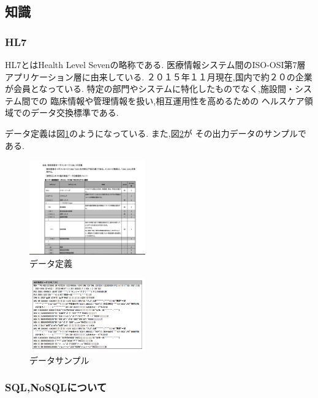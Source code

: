 \subsection{知識}

  \subsubsection{HL7 \cite{bibi5} \cite{bibi6} }
  HL7とはHealth Level Sevenの略称である.
  医療情報システム間のISO-OSI第7層アプリケーション層に由来している.
  ２０１５年１１月現在,国内で約２０の企業が会員となっている.
  特定の部門やシステムに特化したものでなく,施設間・システム間での
  臨床情報や管理情報を扱い,相互運用性を高めるための
  ヘルスケア領域でのデータ交換標準である.

  データ定義は図\ref{ss-mix_sample}のようになっている.
  また,図\ref{ss-mix_sampledata}が
  その出力データのサンプルである.


	\begin{figure}[htbp]
			\includegraphics[width=5cm, bb=0 0 450 600]{./gazou/ss-mix_sample.png} %
		\caption{データ定義}
		\label{ss-mix_sample}
	\end{figure}

	\begin{figure}[htbp]
			\includegraphics[width=5cm, bb=0 0 300 600]{./gazou/ss-mix_sampledata.png}
		\caption{データサンプル}
		\label{ss-mix_sampledata}
	\end{figure}



  \subsubsection{SQL,NoSQLについて}



